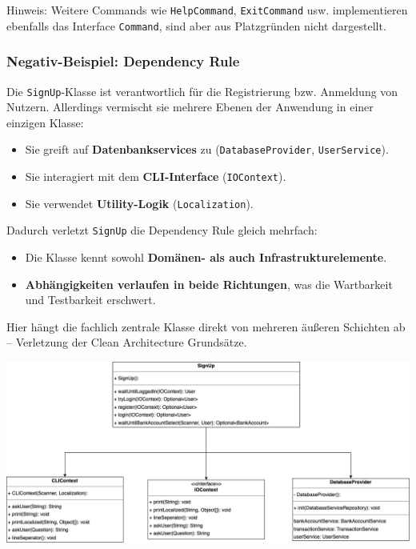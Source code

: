 Hinweis: Weitere Commands wie \texttt{HelpCommand}, \texttt{ExitCommand} usw. implementieren ebenfalls das Interface \texttt{Command}, sind aber aus Platzgründen nicht dargestellt.

\subsubsection*{Negativ-Beispiel: Dependency Rule}
Die \texttt{SignUp}-Klasse ist verantwortlich für die Registrierung bzw. Anmeldung von Nutzern. Allerdings vermischt sie mehrere Ebenen der Anwendung in einer einzigen Klasse:
\begin{itemize}
    \item Sie greift auf \textbf{Datenbankservices} zu (\texttt{DatabaseProvider}, \texttt{UserService}).
    \item Sie interagiert mit dem \textbf{CLI-Interface} (\texttt{IOContext}).
    \item Sie verwendet \textbf{Utility-Logik} (\texttt{Localization}).
\end{itemize}
Dadurch verletzt \texttt{SignUp} die Dependency Rule gleich mehrfach:
\begin{itemize}
    \item Die Klasse kennt sowohl \textbf{Domänen- als auch Infrastrukturelemente}.
    \item \textbf{Abhängigkeiten verlaufen in beide Richtungen}, was die Wartbarkeit und Testbarkeit erschwert.
\end{itemize}

Hier hängt die fachlich zentrale Klasse direkt von mehreren äußeren Schichten ab – Verletzung der Clean Architecture Grundsätze.
\newline

\includegraphics[width=\linewidth]{kapitel2_architektur/DepRulNeg.png}
